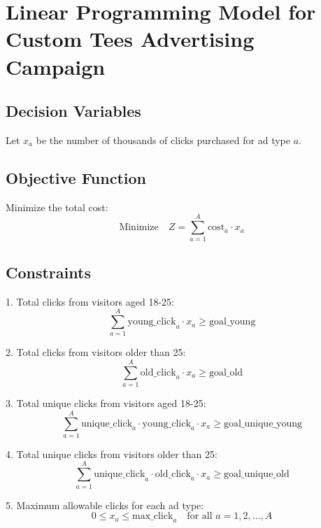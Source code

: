 \documentclass{article}
\begin{document}
\section*{Linear Programming Model for Custom Tees Advertising Campaign}

\subsection*{Decision Variables}
Let \( x_a \) be the number of thousands of clicks purchased for ad type \( a \).

\subsection*{Objective Function}
Minimize the total cost:
\[
\text{Minimize} \quad Z = \sum_{a=1}^{A} \text{cost}_a \cdot x_a
\]

\subsection*{Constraints}
1. Total clicks from visitors aged 18-25:
   \[
   \sum_{a=1}^{A} \text{young\_click}_a \cdot x_a \geq \text{goal\_young}
   \]

2. Total clicks from visitors older than 25:
   \[
   \sum_{a=1}^{A} \text{old\_click}_a \cdot x_a \geq \text{goal\_old}
   \]

3. Total unique clicks from visitors aged 18-25:
   \[
   \sum_{a=1}^{A} \text{unique\_click}_a \cdot \text{young\_click}_a \cdot x_a \geq \text{goal\_unique\_young}
   \]

4. Total unique clicks from visitors older than 25:
   \[
   \sum_{a=1}^{A} \text{unique\_click}_a \cdot \text{old\_click}_a \cdot x_a \geq \text{goal\_unique\_old}
   \]

5. Maximum allowable clicks for each ad type:
   \[
   0 \leq x_a \leq \text{max\_click}_a \quad \text{for all } a = 1, 2, \ldots, A
   \]
\end{document}
